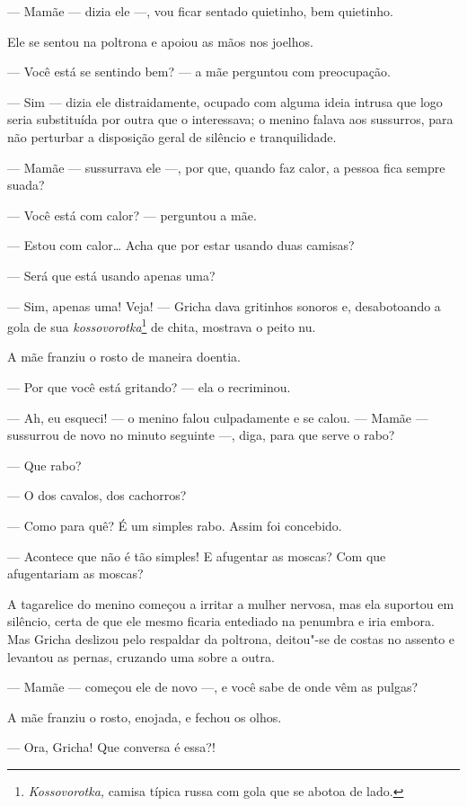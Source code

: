 --- Mamãe --- dizia ele ---, vou ficar sentado quietinho, bem quietinho.

Ele se sentou na poltrona e apoiou as mãos nos joelhos.

--- Você está se sentindo bem? --- a mãe perguntou com preocupação.

--- Sim --- dizia ele distraidamente, ocupado com alguma ideia intrusa
que logo seria substituída por outra que o interessava; o menino falava
aos sussurros, para não perturbar a disposição geral de silêncio e
tranquilidade.

--- Mamãe --- sussurrava ele ---, por que, quando faz calor, a pessoa
fica sempre suada?

--- Você está com calor? --- perguntou a mãe.

--- Estou com calor\ldots{} Acha que por estar usando duas camisas?

--- Será que está usando apenas uma?

--- Sim, apenas uma! Veja! --- Gricha dava gritinhos sonoros e,
desabotoando a gola de sua \emph{kossovorotka}\footnote{\emph{Kossovorotka,}
  camisa típica russa com gola que se abotoa de lado.} de chita,
mostrava o peito nu.

A mãe franziu o rosto de maneira doentia.

--- Por que você está gritando? --- ela o recriminou.

--- Ah, eu esqueci! --- o menino falou culpadamente e se calou. ---
Mamãe --- sussurrou de novo no minuto seguinte ---, diga, para que serve
o rabo?

--- Que rabo?

--- O dos cavalos, dos cachorros?

--- Como para quê? É um simples rabo. Assim foi concebido.

--- Acontece que não é tão simples! E afugentar as moscas? Com que
afugentariam as moscas?

A tagarelice do menino começou a irritar a mulher nervosa, mas ela
suportou em silêncio, certa de que ele mesmo ficaria entediado na
penumbra e iria embora. Mas Gricha deslizou pelo respaldar da poltrona,
deitou"-se de costas no assento e levantou as pernas, cruzando uma sobre
a outra.

--- Mamãe --- começou ele de novo ---, e você sabe de onde vêm as
pulgas?

A mãe franziu o rosto, enojada, e fechou os olhos.

--- Ora, Gricha! Que conversa é essa?!

